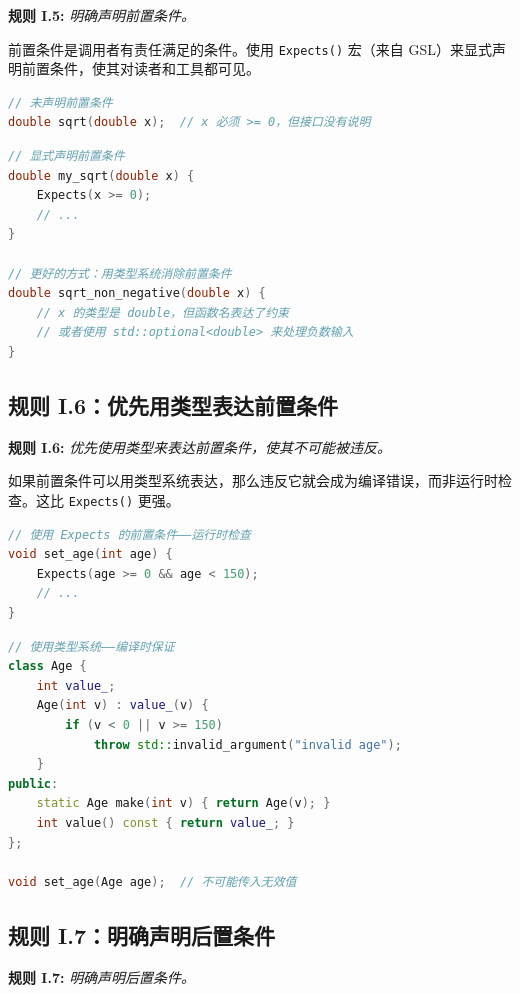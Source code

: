 \textbf{规则 I.5:} \textit{明确声明前置条件。}

前置条件是调用者有责任满足的条件。使用 \texttt{Expects()} 宏（来自 GSL）来显式声明前置条件，使其对读者和工具都可见。

\begin{lstlisting}[language=C++]
// 未声明前置条件
double sqrt(double x);  // x 必须 >= 0，但接口没有说明
\end{lstlisting}

\begin{lstlisting}[language=C++]
// 显式声明前置条件
double my_sqrt(double x) {
    Expects(x >= 0);
    // ...
}

// 更好的方式：用类型系统消除前置条件
double sqrt_non_negative(double x) {
    // x 的类型是 double，但函数名表达了约束
    // 或者使用 std::optional<double> 来处理负数输入
}
\end{lstlisting}

\subsection{规则 I.6：优先用类型表达前置条件}

\textbf{规则 I.6:} \textit{优先使用类型来表达前置条件，使其不可能被违反。}

如果前置条件可以用类型系统表达，那么违反它就会成为编译错误，而非运行时检查。这比 \texttt{Expects()} 更强。

\begin{lstlisting}[language=C++]
// 使用 Expects 的前置条件——运行时检查
void set_age(int age) {
    Expects(age >= 0 && age < 150);
    // ...
}
\end{lstlisting}

\begin{lstlisting}[language=C++]
// 使用类型系统——编译时保证
class Age {
    int value_;
    Age(int v) : value_(v) {
        if (v < 0 || v >= 150)
            throw std::invalid_argument("invalid age");
    }
public:
    static Age make(int v) { return Age(v); }
    int value() const { return value_; }
};

void set_age(Age age);  // 不可能传入无效值
\end{lstlisting}

\subsection{规则 I.7：明确声明后置条件}

\textbf{规则 I.7:} \textit{明确声明后置条件。}

